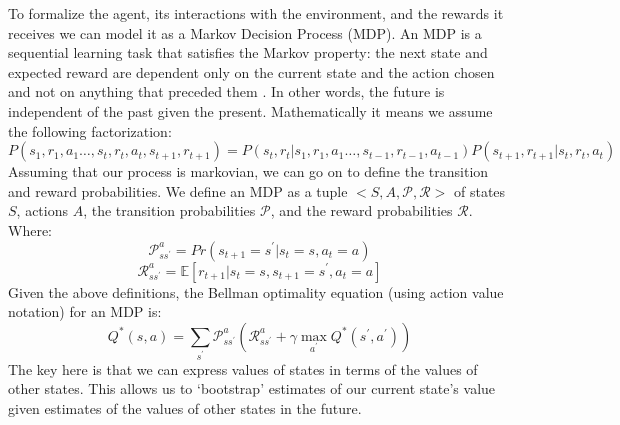 \documentclass[msc, ai, logo, twoside, notimes, parskip, leftchapter, normalheadings]{infthesis}
\begin{document}
To formalize the agent, its interactions with the environment, and the rewards it receives we can model it as a Markov Decision Process (MDP). An MDP is a sequential learning task that satisfies the Markov property: the next state and expected reward are dependent only on the current state and the action chosen and not on anything that preceded them \citep{Russell-norvig}. In other words, the future is independent of the past given the present. Mathematically it means we assume the following factorization:
\begin{equation}
P(s_1, r_1, a_1 \ldots , s_t, r_t, a_t, s_{t+1}, r_{t+1}) = P(s_t, r_t | s_1, r_1, a_1 \ldots , s_{t-1}, r_{t-1}, a_{t-1}) P(s_{t+1}, r_{t+1} | s_t, r_t, a_t)
\end{equation}
Assuming that our process is markovian, we can go on to define the transition and reward probabilities. We define an MDP as a tuple \(<S,A,\mathcal{P},\mathcal{R}>\) of states \(S\), actions \(A\), the transition probabilities \(\mathcal{P}\), and the reward probabilities \(\mathcal{R}\). Where:
\begin{equation}
\mathcal{P}_{s{s^\prime}}^a = Pr(s_{t+1} = {s^\prime} | s_t = s, a_t = a)
\end{equation}
\begin{equation}
\mathcal{R}_{s{s^\prime}}^a = \mathbb{E}[r_{t+1} | s_t = s, s_{t+1} = {s^\prime}, a_t = a]
\end{equation}
Given the above definitions, the Bellman optimality equation (using action value notation) for an MDP is:
\begin{equation}
Q^*(s,a) = \sum_{s^\prime} \mathcal{P}_{s{s^\prime}}^a (\mathcal{R}_{s{s^\prime}}^a + \gamma \max_{a^\prime} Q^*({s^\prime}, {a^\prime}))
\end{equation}
The key here is that we can express values of states in terms of the values of other states. This allows us to `bootstrap' estimates of our current state's value given estimates of the values of other states in the future. 
\end{document}
